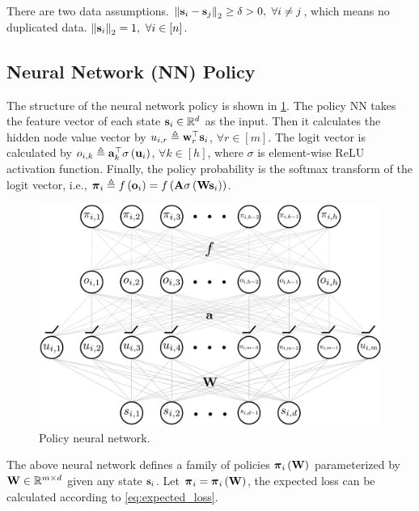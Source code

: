 There are two data assumptions. $\left\| {\mathbf{s}}_{i} -  {\mathbf{s}}_{j} \right\|_2 \ge \delta > 0 , \ \forall i \not= j$, which means no duplicated data. $\left\| {\mathbf{s}}_{i} \right\|_2 = 1, \ \forall i \in [n]$.

\subsection{Neural Network (NN) Policy}

The structure of the neural network policy is shown in \cref{fig:nn_policy}. The policy NN takes the feature vector of each state ${\mathbf{s}}_i \in {\mathbb{R}}^d$ as the input. Then it calculates the hidden node value vector by $u_{i,r} \triangleq {\mathbf{w}}_r^\top {\mathbf{s}}_i$, $\forall r \in [m]$. The logit vector is calculated by $o_{i,k} \triangleq {\mathbf{a}}_k^\top \sigma\left( {\mathbf{u}}_i \right)$, $\forall k \in [h]$, where $\sigma$ is element-wise ReLU activation function. Finally, the policy probability is the softmax transform of the logit vector, i.e., ${\boldsymbol{\pi}}_i \triangleq f\left( {\mathbf{o}}_i \right) = f\left( {\mathbf{A}} \sigma\left( {\mathbf{W}} {\mathbf{s}}_i \right) \right)$. 
\begin{figure}[t]
\vskip 0.2in
\begin{center}
\centerline{\includegraphics[width=\columnwidth]{nn_policy.pdf}}
\caption{Policy neural network.}
\label{fig:nn_policy}
\end{center}
\vskip -0.2in
\end{figure}

The above neural network defines a family of policies ${\boldsymbol{\pi}}_i \left( {\mathbf{W}} \right)$ parameterized by ${\mathbf{W}} \in {\mathbb{R}}^{m \times d}$ given any state ${\mathbf{s}}_i$. Let ${\boldsymbol{\pi}}_i = {\boldsymbol{\pi}}_i \left( {\mathbf{W}} \right)$, the expected loss can be calculated according to \cref{eq:expected_loss}.

